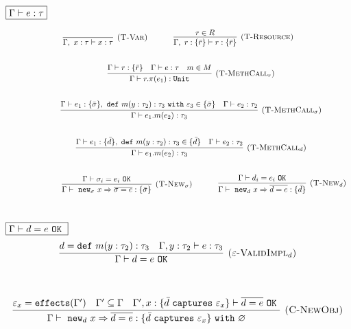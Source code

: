 \documentclass{llncs}
\newcommand{\keywadj}[1]{\mathtt{#1}}
\newcommand{\keyw}[1]{\keywadj{#1}~}
\begin{document}
$\fbox{$\Gamma \vdash e : \tau$}$

\[
\begin{array}{c}
\infer[\textsc{(T-Var)}]
	{\Gamma,~x : \tau \vdash x : \tau}
	{}
~~~~~~~~~~
\infer[\textsc{(T-Resource)}]
	{\Gamma,~r : \{ \bar r \} \vdash r : \{ \bar r \}}
	{r \in R} \\[5ex]
~~~~~~~~~~
\infer[\textsc{(T-MethCall$_r$)}]
	{\Gamma \vdash r.\pi(e_1) : \keywadj{Unit}}
	{\Gamma \vdash r : \{ \bar r \} & \Gamma \vdash e : \tau & m \in M} \\[5ex]
~~~~~~~~~~
\infer[\textsc{(T-MethCall$_\sigma$)}]
	{\Gamma \vdash e_1.m(e_2) : \tau_3}
	{\Gamma \vdash e_1 : \{ \bar \sigma \},~\keyw{def} m(y : \tau_2) : \tau_3~\keyw{with} \varepsilon_3 \in \{ \bar \sigma \} &  \Gamma \vdash e_2 : \tau_2 }\\[5ex]
~~~~~~~~~~
\infer[\textsc{(T-MethCall$_d$)}]
	{\Gamma \vdash e_1.m(e_2) : \tau_3}
	{\Gamma \vdash e_1 : \{ \bar d\},~\keyw{def} m(y : \tau_2) : \tau_3 \in \{ \bar d \} &  \Gamma \vdash e_2 : \tau_2 }\\[5ex]
~~~~~~~~~~

~~~~~~~~~~
\infer[\textsc{(T-New$_\sigma$)}]
	{\Gamma \vdash~\keywadj{new}_\sigma~x \Rightarrow \overline{\sigma = e} : \{ \bar \sigma \}}
	{\Gamma \vdash \sigma_i = e_i~\keywadj{OK}}
~~~~~~~~~~
\infer[\textsc{(T-New$_d$)}]
	{\Gamma \vdash~\keywadj{new}_d~x \Rightarrow \overline{d = e} : \{ \bar d \}}
	{\Gamma \vdash d_i = e_i~\keywadj{OK}}\\[5ex]
\end{array}
\]

$\fbox{$\Gamma \vdash d = e~\keyw{OK}$}$
\[
\begin{array}{c}
\infer[\textsc{($\varepsilon$-ValidImpl$_d$)}]
	{\Gamma \vdash d = e~\keywadj{OK}}
	{d = \keyw{def} m(y : \tau_2) : \tau_3 & \Gamma, y : \tau_2 \vdash e : \tau_3}
	\\[5ex]
\end{array}
\]

\fbox{$\Gamma \vdash e : \tau~\keyw{with} \varepsilon$}

\[
\begin{array}{c}
\infer[\textsc{(C-NewObj)}]
	{\Gamma \vdash~\keywadj{new}_d~x \Rightarrow \overline{d = e} : \{  \bar d~\keyw{captures} \varepsilon_x \} ~\keyw{with} \varnothing }
	{\varepsilon_x = \keywadj{effects}(\Gamma') & \Gamma' \subseteq \Gamma & \Gamma', x : \{ \bar d~\keyw {captures} \varepsilon_x \} \vdash \overline{d = e}~\keyw{OK}} \\[5ex]
\end{array}
\]
\end{document}
